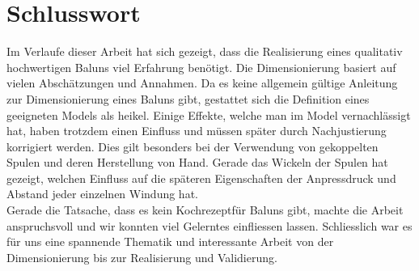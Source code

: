 \section{Schlusswort}
Im Verlaufe dieser Arbeit hat sich gezeigt, dass die Realisierung eines qualitativ hochwertigen Baluns viel Erfahrung benötigt. Die Dimensionierung basiert auf vielen Abschätzungen und Annahmen. Da es keine allgemein gültige Anleitung zur Dimensionierung eines Baluns gibt, gestattet sich die Definition eines geeigneten Models als heikel. Einige Effekte, welche man im Model vernachlässigt hat, haben trotzdem einen Einfluss und müssen später durch Nachjustierung korrigiert werden. Dies gilt besonders bei der Verwendung von gekoppelten Spulen und deren Herstellung von Hand. Gerade das Wickeln der Spulen hat gezeigt, welchen Einfluss auf die späteren Eigenschaften der Anpressdruck und Abstand jeder einzelnen Windung hat.\\
Gerade die Tatsache, dass es kein \glqq Kochrezept\grqq für Baluns gibt, machte die Arbeit anspruchsvoll und wir konnten viel Gelerntes einfliessen lassen.
Schliesslich war es für uns eine spannende Thematik und interessante Arbeit von der Dimensionierung bis zur Realisierung und Validierung.